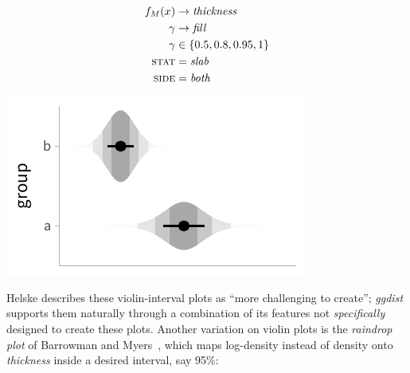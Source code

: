 \documentclass[journal]{vgtc}                     %
\begin{document}
 \noindent
\begin{minipage}{.5\columnwidth}

\begin{align*}
f_M(x) &\rightarrow \textit{thickness}\\
\gamma &\rightarrow \textit{fill}\\
\gamma &\in \{0.5, 0.8, 0.95, 1\}\\
\textsc{stat} &= \mathit{slab}\\
\textsc{side} &= \mathit{both}
\end{align*}
\end{minipage}%
  \begin{minipage}{.4\columnwidth}
    \centering
    \includegraphics[width=1.2\columnwidth]{figs/3-slab_violin_interval.pdf}
  \end{minipage}
\hfill\break

Helske describes these violin-interval plots as ``more challenging to create''; \textit{ggdist} supports them naturally through a combination of its features not \textit{specifically} designed to create these plots. Another variation on violin plots is the \textit{raindrop plot} of Barrowman and Myers~\cite{barrowman2003raindrop}, which maps log-density instead of density onto \textit{thickness} inside a desired interval, say 95\%:
\end{document}
